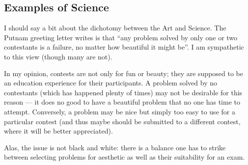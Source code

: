 \documentclass[11pt]{scrartcl}
\theoremstyle{inlined}
\begin{document}
\subsection{Examples of Science}
I should say a bit about the dichotomy between the Art and Science.
The Putnam greeting letter writes is that
``any problem solved by only one or two contestants is a failure,
no matter how beautiful it might be''.
I am sympathetic to this view (though many are not).

In my opinion, contests are not only for fun or beauty;
they are supposed to be an education experience for their participants.
A problem solved by no contestants (which has happened plenty of times)
may not be desirable for this reason --- it does no good
to have a beautiful problem that no one has time to attempt.
Conversely, a problem may be nice but simply too easy to use for a particular contest
(and thus maybe should be submitted to a different contest,
where it will be better appreciated).

Alas, the issue is not black and white: there is a balance
one has to strike between selecting problems for
aesthetic as well as their suitability for an exam.
\end{document}

